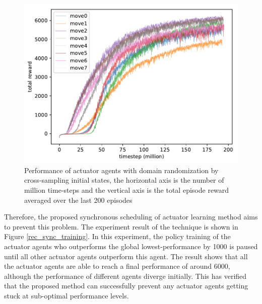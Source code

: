 \begin{figure}[!htbp]
	\includegraphics[width=\textwidth]{images/rec_180617_joint8.pdf}
	\centering
	\caption{Performance of actuator agents with domain randomization by cross-sampling initial states, the horizontal axis is the number of million time-steps and the vertical axis is the total episode reward averaged over the last 200 episodes}\label{rec_8task_training}
\end{figure}

Therefore, the proposed synchronous scheduling of actuator learning method aims to prevent this problem. The experiment result of the technique is shown in Figure \ref{rec_sync_training}. In this experiment, the policy training of the actuator agents who outperforms the global lowest-performance by 1000 is paused until all other actuator agents outperform this agent. The result shows that all the actuator agents are able to reach a final performance of around 6000, although the performance of different agents diverge initially. This has verified that the proposed method can successfully prevent any actuator agents getting stuck at sub-optimal performance levels. 

